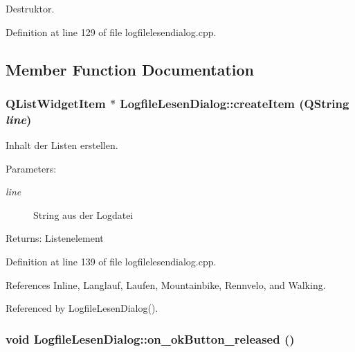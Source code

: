 Destruktor. 



Definition at line 129 of file logfilelesendialog.cpp.

\subsection{Member Function Documentation}
\hypertarget{class_logfile_lesen_dialog_da2f3f4ae517455882e9a2e596e7c3ed}{
\subsubsection[createItem]{\setlength{\rightskip}{0pt plus 5cm}QListWidgetItem $\ast$ LogfileLesenDialog::createItem (QString {\em line})}}
\label{class_logfile_lesen_dialog_da2f3f4ae517455882e9a2e596e7c3ed}


Inhalt der Listen erstellen. 

\begin{Desc}
\item[Parameters:]
\begin{description}
\item[{\em line}]String aus der Logdatei \end{description}
\end{Desc}
\begin{Desc}
\item[Returns:]Listenelement \end{Desc}


Definition at line 139 of file logfilelesendialog.cpp.

References Inline, Langlauf, Laufen, Mountainbike, Rennvelo, and Walking.

Referenced by LogfileLesenDialog().\hypertarget{class_logfile_lesen_dialog_3ec935f830a6ab5cbab8a26f472df991}{
\subsubsection[on\_\-okButton\_\-released]{\setlength{\rightskip}{0pt plus 5cm}void LogfileLesenDialog::on\_\-okButton\_\-released ()}}
\label{class_logfile_lesen_dialog_3ec935f830a6ab5cbab8a26f472df991}


